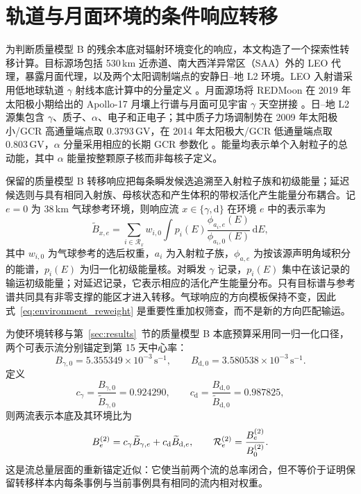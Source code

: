 \documentclass[11pt]{article}
\newcommand{\cps}{\,\mathrm{s^{-1}}}
\begin{document}
\FloatBarrier

\section{轨道与月面环境的条件响应转移}
\label{sec:environment_screening}

为判断质量模型 B 的残余本底对辐射环境变化的响应，本文构造了一个探索性转移计算。目标源场包括 530\,km 近赤道、南大西洋异常区（SAA）外的 LEO 代理，暴露月面代理，以及两个太阳调制端点的安静日--地 L2 环境。LEO 入射谱采用低地球轨道 $\gamma$ 射线本底计算中的分量定义 \cite{Cumani2019LEO}。月面源场将 REDMoon 在 2019 年太阳极小期给出的 Apollo-17 月壤上行谱与月面可见宇宙 $\gamma$ 天空拼接 \cite{Dobynde2021REDMoon}。日--地 L2 源集包含 $\gamma$、质子、$\alpha$、电子和正电子；其中质子力场调制势在 2009 年太阳极小/GCR 高通量端点取 $0.3793$\,GV，在 2014 年太阳极大/GCR 低通量端点取 $0.803$\,GV，$\alpha$ 分量采用相应的长期 GCR 参数化 \cite{Lotti2021Athena,Usoskin2005,Kuznetsov2017}。能量均表示单个入射粒子的总动能，其中 $\alpha$ 能量按整颗原子核而非每核子定义。

保留的质量模型 B 转移响应把每条瞬发候选追溯至入射粒子族和初级能量；延迟候选则与具有相同入射族、母核状态和产生体积的带权活化产生能量分布耦合。记 $e=0$ 为 38\,km 气球参考环境，则响应流 $x\in\{\gamma,\mathrm d\}$ 在环境 $e$ 中的表示率为
\begin{equation}
 \widetilde B_{x,e}=
 \sum_{i\in\mathcal R_x}w_{i,0}
 \int p_i(E)
 \frac{\phi_{a_i,e}(E)}{\phi_{a_i,0}(E)}
 \,\mathrm dE ,
 \label{eq:environment_reweight}
\end{equation}
其中 $w_{i,0}$ 为气球参考的选后权重，$a_i$ 为入射粒子族，$\phi_{a,e}$ 为按该源声明角域积分的能谱，$p_i(E)$ 为归一化初级能量核。对瞬发 $\gamma$ 记录，$p_i(E)$ 集中在该记录的输运初级能量；对延迟记录，它表示相应的活化产生能量分布。只有目标谱与参考谱共同具有非零支撑的能区才进入转移。气球响应的方向模板保持不变，因此式~\eqref{eq:environment_reweight} 是重要性重加权筛查，而不是新的方向匹配输运。

为使环境转移与第~\ref{sec:results}~节的质量模型 B 本底预算采用同一归一化口径，两个可表示流分别锚定到第 15 天中心率：
\[
 B_{\gamma,0}=5.355349\times10^{-3}\cps,\qquad
 B_{\mathrm d,0}=3.580538\times10^{-3}\cps .
\]
定义
\[
 c_\gamma=\frac{B_{\gamma,0}}{\widetilde B_{\gamma,0}}=0.924290,
 \qquad
 c_{\mathrm d}=\frac{B_{\mathrm d,0}}{\widetilde B_{\mathrm d,0}}=0.987825,
\]
则两流表示本底及其环境比为
\begin{equation}
 B^{(2)}_e=c_\gamma\widetilde B_{\gamma,e}
          +c_{\mathrm d}\widetilde B_{\mathrm d,e},
 \qquad
 {\cal R}^{(2)}_e=\frac{B^{(2)}_e}{B^{(2)}_0}.
 \label{eq:environment_two_stream}
\end{equation}
这是流总量层面的重新锚定近似：它使当前两个流的总率闭合，但不等价于证明保留转移样本内每条事例与当前事例具有相同的流内相对权重。
\end{document}

